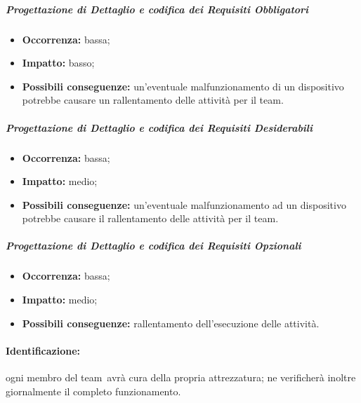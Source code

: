 \documentclass[../PianoProgetto.tex]{subfiles}
\begin{document}
		\subparagraph*{Progettazione di Dettaglio e codifica dei Requisiti Obbligatori}
			\begin{itemize}[label={-}]
				\item \textbf{Occorrenza:} bassa;
				\item \textbf{Impatto:} basso;
				\item \textbf{Possibili conseguenze:} un'eventuale malfunzionamento di un dispositivo potrebbe causare un rallentamento delle attività per il team.
			\end{itemize}
			
		\subparagraph*{Progettazione di Dettaglio e codifica dei Requisiti Desiderabili}
			\begin{itemize}[label={-}]
				\item \textbf{Occorrenza:} bassa;
				\item \textbf{Impatto:} medio;
				\item \textbf{Possibili conseguenze:} un'eventuale malfunzionamento ad un dispositivo potrebbe causare il rallentamento delle attività per il team.
			\end{itemize}
			
		\subparagraph*{Progettazione di Dettaglio e codifica dei Requisiti Opzionali}
			\begin{itemize}[label={-}]
				\item \textbf{Occorrenza:} bassa;
				\item \textbf{Impatto:} medio;
				\item \textbf{Possibili conseguenze:} rallentamento dell'esecuzione delle attività.
			\end{itemize}
			
		
	\paragraph*{Identificazione:} ogni membro del team\g\ avrà cura della propria attrezzatura; ne verificherà inoltre giornalmente il completo funzionamento.
	
\end{document}
